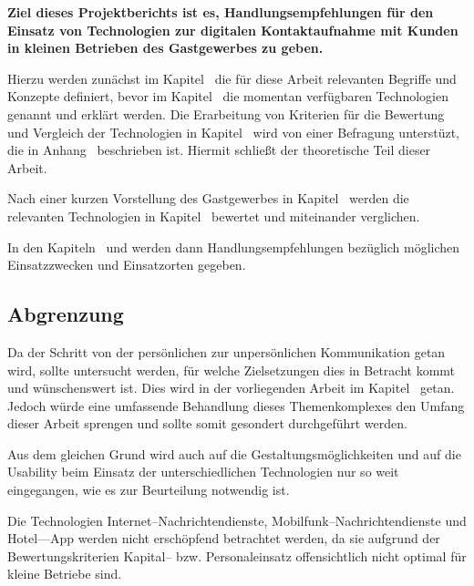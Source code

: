 \textbf{Ziel dieses Projektberichts ist es, Handlungsempfehlungen für den Einsatz von Technologien zur digitalen Kontaktaufnahme mit Kunden in kleinen Betrieben des Gastgewerbes zu geben.}

Hierzu werden zunächst im Kapitel~ die für diese Arbeit relevanten Begriffe und Konzepte definiert, bevor im Kapitel~ die momentan verfügbaren Technologien genannt und erklärt werden. Die Erarbeitung von Kriterien für die Bewertung und Vergleich der Technologien in Kapitel~ wird von einer Befragung unterstüzt, die in Anhang~ beschrieben ist. Hiermit schließt der theoretische Teil dieser Arbeit. 

Nach einer kurzen Vorstellung des Gastgewerbes in Kapitel~ werden die relevanten Technologien in Kapitel~ bewertet und miteinander verglichen.

In den Kapiteln~ und  werden dann Handlungsempfehlungen bezüglich möglichen Einsatzzwecken und Einsatzorten gegeben.


\subsection{Abgrenzung}

Da der Schritt von der persönlichen  zur unpersönlichen Kommunikation getan wird, sollte untersucht werden, für welche Zielsetzungen dies in Betracht kommt und wünschenswert ist. Dies wird in der vorliegenden Arbeit im Kapitel~ getan. Jedoch würde eine umfassende Behandlung dieses Themenkomplexes den Umfang dieser Arbeit sprengen und sollte somit gesondert durchgeführt werden.

Aus dem gleichen Grund wird auch auf die Gestaltungsmöglichkeiten und auf die Usability beim Einsatz der unterschiedlichen Technologien nur so weit eingegangen, wie es zur Beurteilung notwendig ist.

Die Technologien Internet--Nachrichtendienste, Mobilfunk--Nachrichtendienste und Hotel––App werden nicht erschöpfend betrachtet werden, da sie aufgrund der Bewertungskriterien Kapital-- bzw. Personaleinsatz offensichtlich nicht optimal für kleine Betriebe sind.

